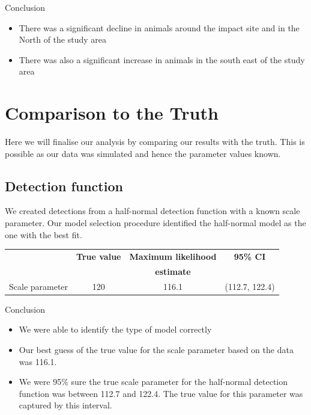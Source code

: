 \begin{block}{Conclusion}
 \begin{itemize}
  \item There was a significant decline in animals around the impact site and in the North of the study area
  \item There was also a significant increase in animals in the south east of the study area
\end{itemize}
\end{block}


\section{Comparison to the Truth}
Here we will finalise our analysis by comparing our results with the truth. This is possible as our data was simulated and hence the parameter values known. \\
\subsection{Detection function}
We created detections from a half-normal detection function with a known scale parameter. Our model selection procedure identified the half-normal model as the one with the best fit. 
\begin{table}[h]
\begin{tabular}{l|c|c|c}
 & \textbf{True value} & \textbf{Maximum likelihood} & \textbf{95\% CI} \\
 & & \textbf{estimate} & \\
\hline
{Scale parameter}& 120 & 116.1  &(112.7, 122.4)\\
\end{tabular}
\end{table}
\begin{block}{Conclusion}
\begin{itemize}
\item{We were able to identify the type of model correctly} 
\item{Our best guess of the true value for the scale parameter based on the data was 116.1. }
\item{We were 95\% sure the true scale parameter for the half-normal detection function was between 112.7 and 122.4. The true value for this parameter was captured by this interval.}
\end{itemize}
\end{block}

